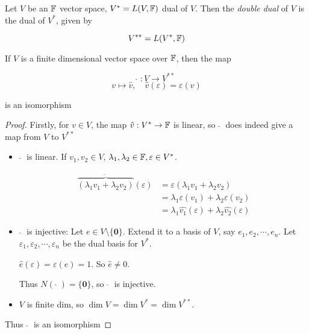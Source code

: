 \documentclass[a4paper]{article}
\begin{document}
\begin{defi}
	Let $ V $ be an $ \mathbb{F} $ vector space, $ V^{*}  = L(V,\mathbb{F}) $ dual of $ V $. Then the \emph{double dual} of $ V $ is the dual of $ V^{*} $, given by
	
	\[ V^{**} = L(V^{*},\mathbb{F}) \] 
\end{defi}

\begin{thm} 
	If $ V $ is a finite dimensional vector space over $ \mathbb{F} $, then the map 
	
	\[ \hat{} \; : V \to V^{**} \]
	\[ v \mapsto \hat{v}, \quad \hat{v}(\varepsilon) = \varepsilon(v) \]
	
	is an isomorphism 
\end{thm}


\begin{proof}
	Firstly, for $ v \in V $, the map $ \hat{v} : V^{*} \to \mathbb{F} $ is linear, so $ \; \hat{} \;  $ does indeed give a map from $ V $ to $ V^{**} $
	
	\begin{itemize}
		\item $ \; \hat{} \; $ is linear. If $ v_{1},v_{2} \in V $, $ \lambda_{1},\lambda_{2} \in \mathbb{F}, \varepsilon \in V^{*} $.
		
		
		
		\begin{align*}
		\overbrace{(\lambda_{1} v_{1} + \lambda_{2} v_{2} )}^{\hat{}} (\varepsilon) & = \varepsilon(  \lambda_{1}v_{1} + \lambda_{2}v_{2} )\\
		& = \lambda_{1} \varepsilon(v_{1}) + \lambda_{2} \varepsilon(v_{2})\\
		& = \lambda_{1} \hat{v_{1}} (\varepsilon) + \lambda_{2} \hat{v_{2}} (\varepsilon)
		\end{align*}
		
		
		\item $ \; \hat{} \; $ is injective: Let $ e \in V \setminus \{ \mathbf{0} \} $. Extend it to a basis of $ V $, say $ e_{1},e_{2},\cdots,e_{n} $. Let $ \varepsilon_{1},\varepsilon_{2},\cdots,\varepsilon_{n} $ be the dual basis for $ V^{*} $.
		
		$ \hat{e}(\varepsilon) = \varepsilon(e) = 1 $. So $ \hat{e} \neq 0 $.
		
		Thus $ N(\; \hat{} \;) = \{ \mathbf{0} \} $, so $ \; \hat{} \; $ is injective.
		
		\item $ V $ is finite dim, so $ \dim V = \dim V^{*} = \dim V^{**} $. 
		
	\end{itemize}

Thus $ \; \hat{} \; $ is an isomorphism	
	
\end{proof}
\end{document}
